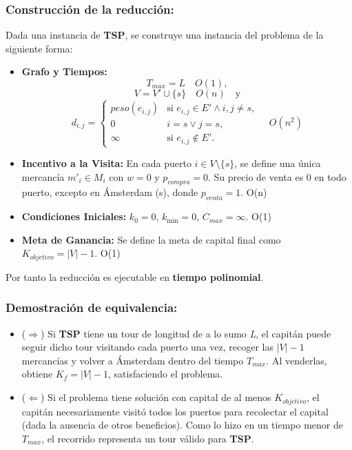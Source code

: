 \documentclass[12pt, a4paper]{article}
\begin{document}
\subsubsection{Construcción de la reducción:}
Dada una instancia de \textbf{TSP}, se construye una instancia del problema de la siguiente forma:
\begin{itemize}
    \item \textbf{Grafo y Tiempos:} \\
    \[T_{max} = L \quad O(1),\] 
    \[V = V' \cup \{s\} \quad O(n) \quad \text{y}\]
    \[ 
    d_{i,j} = 
    \begin{cases} 
    peso(e_{i,j}) & \text{si } e_{i,j} \in E' \wedge  i,j \neq s, \\
    0 & i = s \lor j = s, \\
    \infty & \text{si } e_{i,j} \notin E'. 
    \end{cases} 
    \quad O(n ^ 2)
    \]
    \item \textbf{Incentivo a la Visita:} En cada puerto $i \in V \setminus \{s\}$, se define una única mercancía $m'_i \in M_i$ con $w=0$ y $p_{compra}=0$. Su precio de venta es 0 en todo puerto, excepto en Ámsterdam (s), donde $p_{venta}=1$. O(n)
    \item \textbf{Condiciones Iniciales:} $k_0 = 0$, $k_{\min} = 0$, $C_{max} = \infty$. O(1)
    \item \textbf{Meta de Ganancia:} Se define la meta de capital final como $K_{objetivo} = |V|-1$. O(1)
\end{itemize}

Por tanto la reducción es ejecutable en \textbf{tiempo polinomial}.

\subsubsection{Demostración de equivalencia:}
\begin{itemize}
    \item ($\Rightarrow$) Si \textbf{TSP} tiene un tour de longitud de a lo sumo \textit{L}, el capitán puede seguir dicho tour visitando cada puerto una vez, recoger las $|V|-1$ mercancías y volver a Ámsterdam dentro del tiempo $T_{max}$. Al venderlas, obtiene $K_f = |V|-1$, satisfaciendo el problema.
    \item ($\Leftarrow$) Si el problema tiene solución con capital de al menos \textit{$K_{objetivo}$}, el capitán necesariamente visitó todos los puertos para recolectar el capital (dada la ausencia de otros beneficios). Como lo hizo en un tiempo menor de $T_{max}$, el recorrido representa un tour válido para \textbf{TSP}.
\end{itemize}
\end{document}
